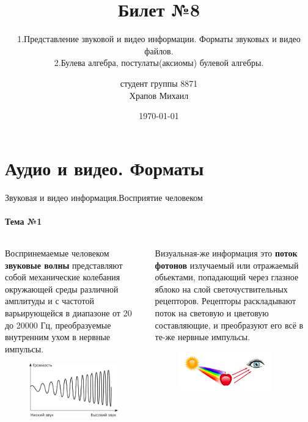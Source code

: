 \documentclass[aspectratio=169]{beamer}
\title{Билет №8}
\subtitle{1.Представление звуковой и видео информации. Форматы звуковых и видео файлов.\\ 2.Булева алгебра, постулаты(аксиомы) булевой алгебры.}
\author{\small студент группы 8871\\ Храпов Михаил}
\institute{\scriptsize СПБГЭУ «ЛЭТИ» им. В.И. Ульянова (Ленина)}
\date{\today}
\begin{document}
\begin{frame}
\titlepage
\end{frame} 

\section{Аудио и видео. Форматы}
\begin{frame}{Звуковая и видео информация.Восприятие человеком}

\framesubtitle{Тема №1}

\begin{columns}
\begin{column}[t]{7cm}
\small Воспринемаемые человеком \textbf{звуковые волны} представляют собой механические колебания окружающей среды различной амплитуды и с частотой варьирующейся в диапазоне от 20 до 20000 Гц, преобразуемые внутренним ухом в нервные импульсы.\\ 
\begin{figure}[h!]
\centering
\includegraphics[width=4cm]{sound.png}
\end{figure}
\end{column}
\begin{column}[t]{7cm}
\small Визуальная-же информация это \textbf{поток фотонов} излучаемый или отражаемый обьектами, попадающий через глазное яблоко на слой светочуствительных рецепторов. Рецепторы раскладывают поток на световую и цветовую составляющие, и преобразуют его всё в те-же нервные импульсы.
\begin{figure}[h!]
\centering
\includegraphics[width=4cm]{vi.jpeg}
\end{figure}
\end{column}
\end{columns}
\end{frame}
\end{document}
